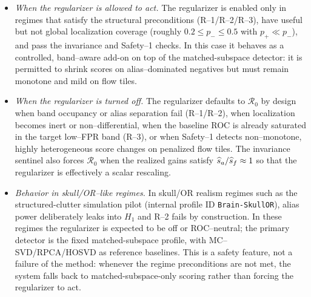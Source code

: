 \begin{itemize}[nosep]
  \item \emph{When the regularizer is allowed to act.} The regularizer is enabled only in regimes that satisfy the structural preconditions (R--1/R--2/R--3), have useful but not global localization coverage (roughly $0.2\le p_-\le 0.5$ with $p_+\ll p_-$), and pass the invariance and Safety--1 checks. In this case it behaves as a controlled, band--aware add-on on top of the matched-subspace detector: it is permitted to shrink scores on alias--dominated negatives but must remain monotone and mild on flow tiles.
  \item \emph{When the regularizer is turned off.} The regularizer defaults to $\mathcal{R}_0$ by design when band occupancy or alias separation fail (R--1/R--2), when localization becomes inert or non--differential, when the baseline ROC is already saturated in the target low--FPR band (R--3), or when Safety--1 detects non--monotone, highly heterogeneous score changes on penalized flow tiles. The invariance sentinel also forces $\mathcal{R}_0$ when the realized gains satisfy $\widehat s_a/\widehat s_f\approx 1$ so that the regularizer is effectively a scalar rescaling.
  \item \emph{Behavior in skull/OR--like regimes.} In skull/OR realism regimes such as the structured-clutter simulation pilot (internal profile ID \texttt{Brain-SkullOR}), alias power deliberately leaks into $H_1$ and R--2 fails by construction. In these regimes the regularizer is expected to be off or ROC--neutral; the primary detector is the fixed matched-subspace profile, with MC--SVD/\allowbreak RPCA/\allowbreak HOSVD as reference baselines. This is a safety feature, not a failure of the method: whenever the regime preconditions are not met, the system falls back to matched-subspace-only scoring rather than forcing the regularizer to act.
\end{itemize}

